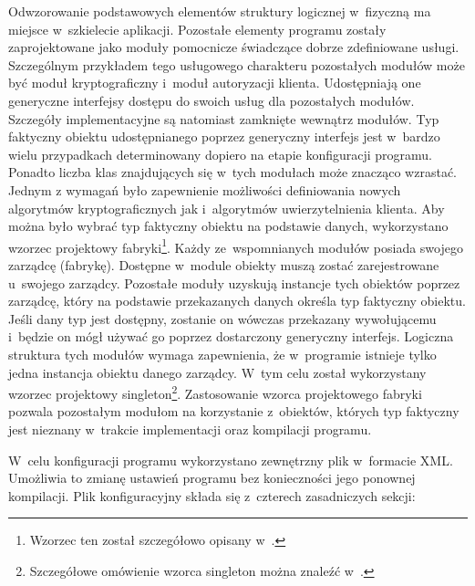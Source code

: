 Odwzorowanie podstawowych elementów struktury logicznej w~fizyczną ma
miejsce w~szkielecie aplikacji. Pozostałe elementy programu zostały
zaprojektowane jako moduły pomocnicze świadczące dobrze zdefiniowane
usługi. Szczególnym przykładem tego usługowego charakteru pozostałych
modułów może być moduł kryptograficzny i~moduł autoryzacji
klienta. Udostępniają one generyczne interfejsy dostępu do swoich
usług dla pozostałych modułów. Szczegóły implementacyjne są natomiast
zamknięte wewnątrz modułów. Typ faktyczny obiektu udostępnianego
poprzez generyczny interfejs jest w~bardzo wielu przypadkach
determinowany dopiero na etapie konfiguracji programu. Ponadto liczba
klas znajdujących się w~tych modułach może znacząco wzrastać. Jednym z
wymagań było zapewnienie możliwości definiowania nowych algorytmów
kryptograficznych jak i~algorytmów uwierzytelnienia klienta. Aby można
było wybrać typ faktyczny obiektu na podstawie danych, wykorzystano
wzorzec projektowy fabryki\footnote{Wzorzec ten został szczegółowo
  opisany w~\cite[101-109]{book:wzorce}.}.  Każdy ze~wspomnianych
modułów posiada swojego zarządcę (fabrykę). Dostępne w~module obiekty
muszą zostać zarejestrowane u~swojego zarządcy. Pozostałe moduły
uzyskują instancje tych obiektów poprzez zarządcę, który na podstawie
przekazanych danych określa typ faktyczny obiektu. Jeśli dany typ jest
dostępny, zostanie on wówczas przekazany wywołującemu i~będzie on mógł
używać go poprzez dostarczony generyczny interfejs. Logiczna struktura
tych modułów wymaga zapewnienia, że w~programie istnieje tylko jedna
instancja obiektu danego zarządcy. W~tym celu został wykorzystany
wzorzec projektowy singleton\footnote{Szczegółowe omówienie wzorca
  singleton można znaleźć
  w~\cite[130-138]{book:wzorce}.}. Zastosowanie wzorca projektowego
fabryki pozwala pozostałym modułom na korzystanie z~obiektów, których
typ faktyczny jest nieznany w~trakcie implementacji oraz kompilacji
programu.

W~celu konfiguracji programu wykorzystano zewnętrzny plik w~formacie
XML. Umożliwia to zmianę ustawień programu bez konieczności jego
ponownej kompilacji. Plik konfiguracyjny składa się z~czterech
zasadniczych sekcji:

